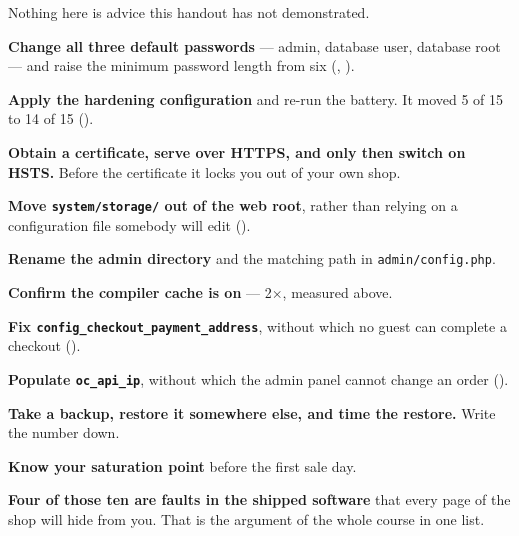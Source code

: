 \begin{examplebox}
Nothing here is advice this handout has not demonstrated.

\begin{tightnum}
  \item \textbf{Change all three default passwords} --- admin, database user,
        database root --- and raise the minimum password length from six
        (, ).
  \item \textbf{Apply the hardening configuration} and re-run the battery. It
        moved 5 of 15 to 14 of 15 ().
  \item \textbf{Obtain a certificate, serve over HTTPS, and only then switch on
        HSTS.} Before the certificate it locks you out of your own shop.
  \item \textbf{Move \texttt{system/storage/} out of the web root}, rather than
        relying on a configuration file somebody will edit
        ().
  \item \textbf{Rename the admin directory} and the matching path in
        \texttt{admin/config.php}.
  \item \textbf{Confirm the compiler cache is on} --- 2$\times$, measured
        above.
  \item \textbf{Fix \texttt{config\_checkout\_payment\_address}}, without which
        no guest can complete a checkout ().
  \item \textbf{Populate \texttt{oc\_api\_ip}}, without which the admin panel
        cannot change an order ().
  \item \textbf{Take a backup, restore it somewhere else, and time the
        restore.} Write the number down.
  \item \textbf{Know your saturation point} before the first sale day.
\end{tightnum}

\smallskip
\textbf{Four of those ten are faults in the shipped software} that every page
of the shop will hide from you. That is the argument of the whole course in one
list.
\end{examplebox}

